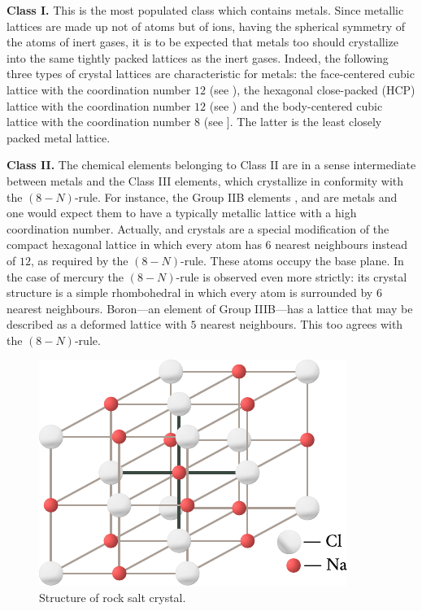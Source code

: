 \textbf{Class I.} This is the most populated class which contains metals. Since metallic lattices are made up not of atoms but of ions, having the spherical symmetry of the atoms of inert gases, it is to be expected that metals too should crystallize into the same tightly packed lattices as the inert gases. Indeed, the following three types of crystal lattices are characteristic for metals: the face-centered cubic lattice with the coordination number $12$ (see ), the hexagonal
close-packed (HCP) lattice with the coordination number $12$ (see
) and the body-centered cubic lattice with the coordination number $8$ (see ]. The latter is the least closely packed metal lattice.

\textbf{Class II.} The chemical elements belonging to Class II are in a sense intermediate between metals and the Class III elements, which crystallize in conformity with the $(8-N)$-rule. For instance, the Group IIB elements ,  and  are metals and one would expect them to have a typically metallic lattice with a high coordination number. Actually,  and  crystals are a special modification of the compact hexagonal lattice in which every atom has $6$ nearest neighbours instead of $12$, as required by the $(8-N)$-rule. These atoms occupy the base plane. In the case of mercury the $(8-N)$-rule is observed even more strictly: its crystal structure is a simple rhombohedral in which every atom is surrounded by $6$ nearest neighbours. Boron---an element of Group IIIB---has a lattice that may be described as a deformed lattice with $5$ nearest neighbours. This too agrees with the $(8-N)$-rule.

\begin{figure}[t]
	\begin{center}
		\includegraphics[scale=0.95]{figures/ch_01/fig_1_21.pdf}
		\caption[]{Structure of rock salt  crystal.}
		\label{fig:1_21}
	\end{center}
	\vspace{-0.6cm}
\end{figure}

